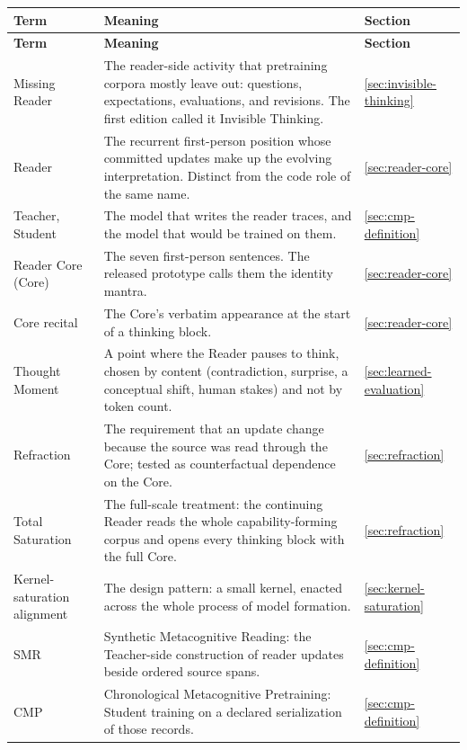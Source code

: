 \documentclass[11pt]{article}
\begin{document}
\begingroup
\small
\setlength{\tabcolsep}{4pt}
\begin{longtable}{
  >{\raggedright\arraybackslash}p{3.6cm}
  >{\raggedright\arraybackslash}p{9.0cm}
  >{\raggedright\arraybackslash}p{1.6cm}}
\toprule
\textbf{Term} & \textbf{Meaning} & \textbf{Section} \\
\midrule
\endfirsthead
\toprule
\textbf{Term} & \textbf{Meaning} & \textbf{Section} \\
\midrule
\endhead
\bottomrule
\endlastfoot
Missing Reader & The reader-side activity that pretraining corpora mostly leave out: questions, expectations, evaluations, and revisions. The first edition called it Invisible Thinking. & \ref{sec:invisible-thinking} \\
Reader & The recurrent first-person position whose committed updates make up the evolving interpretation. Distinct from the code role of the same name. & \ref{sec:reader-core} \\
Teacher, Student & The model that writes the reader traces, and the model that would be trained on them. & \ref{sec:cmp-definition} \\
Reader Core (Core) & The seven first-person sentences. The released prototype calls them the identity mantra. & \ref{sec:reader-core} \\
Core recital & The Core's verbatim appearance at the start of a thinking block. & \ref{sec:reader-core} \\
Thought Moment & A point where the Reader pauses to think, chosen by content (contradiction, surprise, a conceptual shift, human stakes) and not by token count. & \ref{sec:learned-evaluation} \\
Refraction & The requirement that an update change because the source was read through the Core; tested as counterfactual dependence on the Core. & \ref{sec:refraction} \\
Total Saturation & The full-scale treatment: the continuing Reader reads the whole capability-forming corpus and opens every thinking block with the full Core. & \ref{sec:refraction} \\
Kernel-saturation alignment & The design pattern: a small kernel, enacted across the whole process of model formation. & \ref{sec:kernel-saturation} \\
SMR & Synthetic Metacognitive Reading: the Teacher-side construction of reader updates beside ordered source spans. & \ref{sec:cmp-definition} \\
CMP & Chronological Metacognitive Pretraining: Student training on a declared serialization of those records. & \ref{sec:cmp-definition} \\

\end{longtable}
\end{document}
